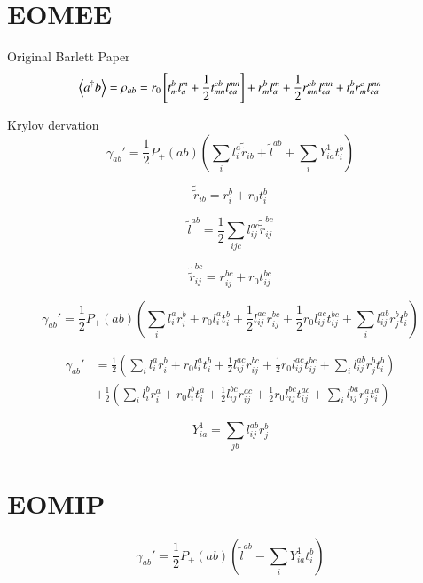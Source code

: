 \documentclass[aip,jcp,reprint,amsmath,amssymb,floatfix,citeautoscript,nofootinbib,onecolumn]{revtex4-2}
\begin{document}
\section{EOMEE}
Original Barlett Paper
\begin{equation}
	\expval{a^\dagger b}=\rho_{ab} = r_0\left[t^b_ml^m_a+\frac{1}{2}t^{eb}_{mn}l^{mn}_{ea}\right] + r^b_ml^m_a+\frac{1}{2}r^{eb}_{mn}l^{mn}_{ea} + t^b_nr^e_ml^{mn}_{ea}
\end{equation}

Krylov dervation
\begin{equation}
	\gamma_{ab}' = \frac{1}{2}P_+(ab)\left(\sum_il^a_i\tilde{\tilde{r}}_{ib}+\tilde{l}^{ab}+\sum_iY^1_{ia}t^b_i\right)
\end{equation}

\begin{equation}
	\tilde{\tilde{r}}_{ib}=r^b_i+r_0t^b_i
\end{equation}

\begin{equation}
	\tilde{l}^{ab} = \frac{1}{2}\sum_{ijc}l^{ac}_{ij}\tilde{\tilde{r}}^{bc}_{ij}
\end{equation}

\begin{equation}
	\tilde{\tilde{r}}^{bc}_{ij} = r^{bc}_{ij}+r_0t^{bc}_{ij}
\end{equation}

\begin{equation}
	\gamma_{ab}' = \frac{1}{2}P_+(ab)\left(\sum_il^a_ir^b_i+r_0l^a_it^b_i+\frac{1}{2}l^{ac}_{ij}r^{bc}_{ij}+\frac{1}{2}r_0l^{ac}_{ij}t^{bc}_{ij}+\sum_il^{ab}_{ij}r^b_jt^b_i\right)
\end{equation}

\begin{align}
	\gamma_{ab}' &= \frac{1}{2}\left(\sum_il^a_ir^b_i+r_0l^a_it^b_i+\frac{1}{2}l^{ac}_{ij}r^{bc}_{ij}+\frac{1}{2}r_0l^{ac}_{ij}t^{bc}_{ij}+\sum_il^{ab}_{ij}r^b_jt^b_i\right) \\
	&+\frac{1}{2}\left(\sum_il^b_ir^a_i+r_0l^b_it^a_i+\frac{1}{2}l^{bc}_{ij}r^{ac}_{ij}+\frac{1}{2}r_0l^{bc}_{ij}t^{ac}_{ij}+\sum_il^{ba}_{ij}r^a_jt^a_i\right)
\end{align}

\begin{equation}
	Y^1_{ia} = \sum_{jb}l^{ab}_{ij}r^b_j
\end{equation}

\section{EOMIP}
\begin{equation}
	\gamma_{ab}'=\frac{1}{2}P_+(ab)\left(\tilde{l}^{ab}-\sum_iY^1_{ia}t^b_i\right)
\end{equation}
\end{document}
